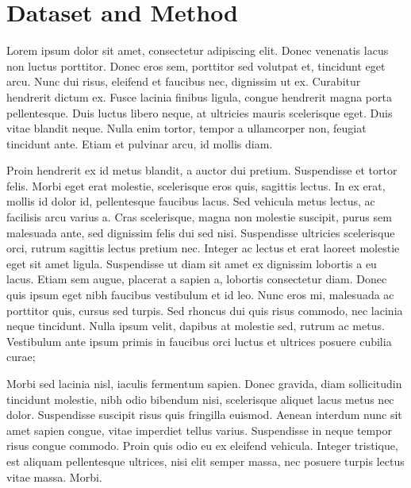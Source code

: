 \documentclass{ltjarticle}
\begin{document}

\section{Dataset and Method}

Lorem ipsum dolor sit amet, consectetur adipiscing elit. Donec venenatis lacus non luctus porttitor. Donec eros sem, porttitor sed volutpat et, tincidunt eget arcu. Nunc dui risus, eleifend et faucibus nec, dignissim ut ex. Curabitur hendrerit dictum ex. Fusce lacinia finibus ligula, congue hendrerit magna porta pellentesque. Duis luctus libero neque, at ultricies mauris scelerisque eget. Duis vitae blandit neque. Nulla enim tortor, tempor a ullamcorper non, feugiat tincidunt ante. Etiam et pulvinar arcu, id mollis diam.

Proin hendrerit ex id metus blandit, a auctor dui pretium. Suspendisse et tortor felis. Morbi eget erat molestie, scelerisque eros quis, sagittis lectus. In ex erat, mollis id dolor id, pellentesque faucibus lacus. Sed vehicula metus lectus, ac facilisis arcu varius a. Cras scelerisque, magna non molestie suscipit, purus sem malesuada ante, sed dignissim felis dui sed nisi. Suspendisse ultricies scelerisque orci, rutrum sagittis lectus pretium nec. Integer ac lectus et erat laoreet molestie eget sit amet ligula. Suspendisse ut diam sit amet ex dignissim lobortis a eu lacus. Etiam sem augue, placerat a sapien a, lobortis consectetur diam. Donec quis ipsum eget nibh faucibus vestibulum et id leo. Nunc eros mi, malesuada ac porttitor quis, cursus sed turpis. Sed rhoncus dui quis risus commodo, nec lacinia neque tincidunt. Nulla ipsum velit, dapibus at molestie sed, rutrum ac metus. Vestibulum ante ipsum primis in faucibus orci luctus et ultrices posuere cubilia curae;

Morbi sed lacinia nisl, iaculis fermentum sapien. Donec gravida, diam sollicitudin tincidunt molestie, nibh odio bibendum nisi, scelerisque aliquet lacus metus nec dolor. Suspendisse suscipit risus quis fringilla euismod. Aenean interdum nunc sit amet sapien congue, vitae imperdiet tellus varius. Suspendisse in neque tempor risus congue commodo. Proin quis odio eu ex eleifend vehicula. Integer tristique, est aliquam pellentesque ultrices, nisi elit semper massa, nec posuere turpis lectus vitae massa. Morbi. 
\end{document}
